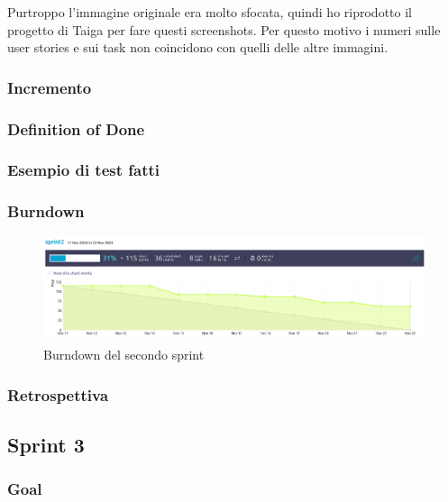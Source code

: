 \documentclass{article}
\begin{document}
Purtroppo l'immagine originale era molto sfocata, quindi ho riprodotto il progetto di Taiga per fare questi screenshots.
Per questo motivo i numeri sulle user stories e sui task non coincidono con quelli delle altre immagini.

\subsubsection{Incremento}

\subsubsection{Definition of Done}

\subsubsection{Esempio di test fatti}

\subsubsection{Burndown}
\begin{figure}[H]
    \centering
    \includegraphics[width=1\textwidth]{burndown2}
    \caption{Burndown del secondo sprint}
    \label{fig:burndown2}
\end{figure}

\subsubsection{Retrospettiva}

\subsection{Sprint 3}

\subsubsection{Goal}
\end{document}
